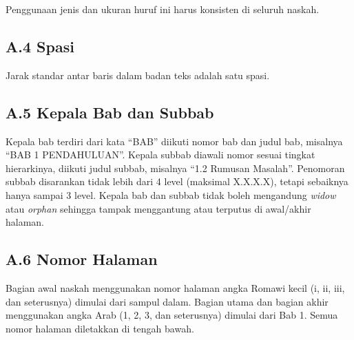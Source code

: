 Penggunaan jenis dan ukuran huruf ini harus konsisten di seluruh naskah.

\subsection*{A.4 Spasi}

Jarak standar antar baris dalam badan teks adalah satu spasi.

\subsection*{A.5 Kepala Bab dan Subbab}

Kepala bab terdiri dari kata ``BAB'' diikuti nomor bab dan judul bab,
misalnya ``BAB 1 PENDAHULUAN''. Kepala subbab diawali nomor sesuai
tingkat hierarkinya, diikuti judul subbab, misalnya ``1.2 Rumusan
Masalah''. Penomoran subbab disarankan tidak lebih dari 4 level
(maksimal X.X.X.X), tetapi sebaiknya hanya sampai 3 level. Kepala bab
dan subbab tidak boleh mengandung \emph{widow} atau \emph{orphan}
sehingga tampak menggantung atau terputus di awal/akhir halaman.

\subsection*{A.6 Nomor Halaman}

Bagian awal naskah menggunakan nomor halaman angka Romawi kecil (i, ii,
iii, dan seterusnya) dimulai dari sampul dalam. Bagian utama dan bagian
akhir menggunakan angka Arab (1, 2, 3, dan seterusnya) dimulai dari
Bab 1. Semua nomor halaman diletakkan di tengah bawah.

